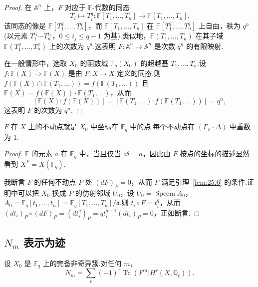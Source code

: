 \begin{proof}
在 $\mathbb{A}^{n}$ 上，$F$ 对应于 $\mathbb{F}$-代数的同态
\[
T_i \mapsto T^{q}_i \colon \mathbb{F}[T_1, \ldots, T_n] \to \mathbb{F}[T_1, \ldots, T_n].
\]
该同态的像是 $\mathbb{F}[T^{q}_1, \ldots, T^{q}_n]$，而 $\mathbb{F}[T_1, \ldots, T_n]$ 在 $\mathbb{F}[T^{q}_1, \ldots, T^{q}_n]$ 上自由，秩为 $q^{n}$(以元素 $T^{i_1}_1 \cdots T^{i_n}_n$，$0 \leq i_j \leq q - 1$ 为基).类似地，$\mathbb{F}(T_1, \ldots, T_n)$ 在其子域 $\mathbb{F}(T^{q}_1, \ldots, T^{q}_n)$ 上的次数为 $q^{n}$.这表明 $F \colon \mathbb{A}^{n} \to \mathbb{A}^{n}$ 是次数 $q^{n}$ 的有限映射.

在一般情形中，选取 $X_0$ 的函数域 $\mathbb{F}_q(X_0)$ 的超越基 $T_1, \ldots, T_n$.设 $f \colon \mathbb{F}(X) \to \mathbb{F}(X)$ 是由 $F \colon X \to X$ 定义的同态.则 $f(\mathbb{F}(X) \cap \mathbb{F}(T_1, \ldots)) = f(\mathbb{F}(T_1, \ldots))$ 且 $\mathbb{F}(X) = f(\mathbb{F}(X)) \cdot \mathbb{F}(T_1, \ldots)$，从而
\[
[\mathbb{F}(X) \colon f(\mathbb{F}(X))] = [\mathbb{F}(T_1, \ldots) \colon f(\mathbb{F}(T_1, \ldots))] = q^{n},
\]
这表明 $F$ 的次数为 $q^{n}$.
\end{proof}

\begin{lemma}\label{lem:27.2}
$F$ 在 $X$ 上的不动点就是 $X_0$ 中坐标在 $\mathbb{F}_q$ 中的点.每个不动点在 $(\Gamma_{F} \cdot \Delta)$ 中重数为 1.
\end{lemma}

\begin{proof}
$\mathbb{F}$ 的元素 $a$ 在 $\mathbb{F}_q$ 中，当且仅当 $a^{q} = a$，因此由 $F$ 按点的坐标的描述显然看到 $X^{F} = X(\mathbb{F}_q)$.

我断言 $F$ 的任何不动点 $P$ 处 $(dF)_P = 0$，从而 $F$ 满足引理~\ref{lem:25.6} 的条件.证明中可以把 $X_0$ 换成 $P$ 的仿射邻域 $U_0$，设 $U_0 = \operatorname{Specm} A_0$，$A_0 = \mathbb{F}_q[t_1, \ldots, t_n] = \mathbb{F}_q[T_1, \ldots, T_n]/\mathfrak{a}$.则 $t_i \circ F = t^{q}_i$，从而 $(dt_i)_P \circ (dF)_P = (dt^{q}_i)_P = qt^{q-1}_i (dt_i)_P = 0$，正如断言.
\end{proof}

\subsection*{\texorpdfstring{$N_m$ 表示为迹}{N_m 表示为迹}}

\begin{proposition}\label{prop:27.3}
设 $X_0$ 是 $\mathbb{F}_q$ 上的完备非奇异簇.对任何 $m$，
\[
N_m = \sum_{r} (-1)^{r} \operatorname{Tr}(F^{m}|H^{r}(X, \mathbb{Q}_{\ell})).
\]
\end{proposition}


